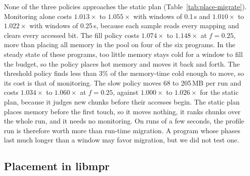 \documentclass[11pt]{article}
\newcommand{\tabref}[1]{Table~\ref{#1}}
\begin{document}
\begin{table}[t]
\centering
\small
\caption{Moving memory while the program runs, against the static cold plan from a profile of the same input: run time
over the run with no plan ($\times$), median of 5 runs. Monitor: the accessed bits sampled and cleared at the window
length, no memory moved. Fill, threshold and slow at $f = 0.25$ or $0.5$ of the anonymous RSS. Three sets of runs, each
with its own baseline.}
\label{tab:place-migrate}
\setlength{\tabcolsep}{3.5pt}

\end{table}

None of the three policies approaches the static plan (\tabref{tab:place-migrate}). Monitoring alone costs
$1.013\times$ to $1.055\times$ with windows of 0.1\,s and $1.010\times$ to $1.022\times$ with windows of 0.25\,s,
because each sample reads every mapping and clears every accessed bit. The fill policy costs $1.074\times$ to
$1.148\times$ at $f = 0.25$, more than placing all memory in the pool on four of the six programs. In the steady state of these
programs, too little memory stays cold for a window to fill the budget, so the policy places hot memory and moves it
back and forth. The threshold policy finds less than 3\% of the memory-time cold enough to move, so its cost is that
of monitoring. The slow policy moves 68 to 205\,MB per run and costs $1.034\times$ to $1.060\times$ at $f = 0.25$,
against $1.000\times$ to $1.026\times$ for the static plan, because it judges new chunks before their accesses begin. The
static plan places memory before the first touch, so it moves nothing, it ranks chunks over the whole run, and it
needs no monitoring. On runs of a few seconds, the profile run is therefore worth more than run-time migration. A
program whose phases last much longer than a window may favor migration, but we did not test one.

\subsection{Placement in libmpr}
\end{document}
